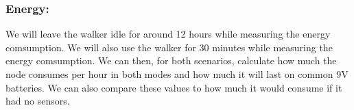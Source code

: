 \subsubsection{Energy:}
We will leave the walker idle for around 12 hours while measuring the energy comsumption.
We will also use the walker for 30 minutes while measuring the energy comsumption. 
We can then, for both scenarios, calculate how much the node consumes per hour in both modes and how much it will last on common 9V batteries. We can also compare these values to how much it would consume if it had no sensors.

